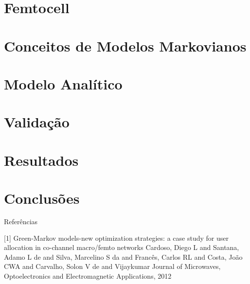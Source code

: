 \documentclass{beamer}
\begin{document}
\frame{\tableofcontents[currentsection]}



\section{Femtocell}
\frame{\tableofcontents[currentsection]}


\section{Conceitos de Modelos Markovianos}
\frame{\tableofcontents[currentsection]}


\section{Modelo Analítico}
\frame{\tableofcontents[currentsection]}


\section{Validação}
\frame{\tableofcontents[currentsection]}


\section{Resultados}
\frame{\tableofcontents[currentsection]}


\section{Conclusões}
\frame{\tableofcontents[currentsection]}



\begin{frame}[allowframebreaks]{Referências}
% 

\begin{thebibliography}{10}
		[1]
			Green-Markov models-new optimization strategies: a case study
      for user allocation in co-channel macro/femto networks
      \newblock Cardoso, Diego L and Santana, Adamo L de and Silva, Marcelino S da and
      Franc{\^e}s, Carlos RL and Costa, Jo{\~a}o CWA and Carvalho, Solon V de
      and Vijaykumar
			\newblock Journal of Microwaves, Optoelectronics and Electromagnetic
      Applications, 2012
\end{thebibliography}
\end{frame}
\end{document}
